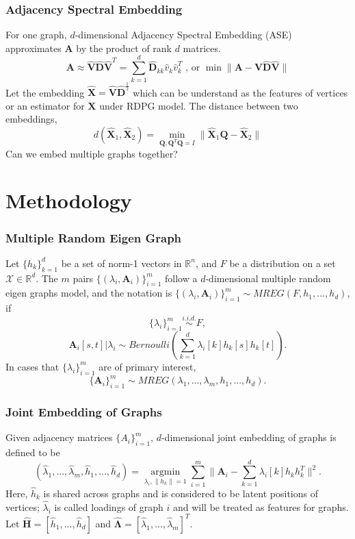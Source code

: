 \documentclass[]{beamer}
\newcommand{\bA}{\mathbf{A}}
\newcommand{\bH}{\mathbf{H}}
\newcommand{\bX}{\mathbf{X}}
\newcommand{\bD}{\mathbf{D}}
\newcommand{\bV}{\mathbf{V}}
\newcommand{\bQ}{\mathbf{Q}}
\newcommand{\bLambda}{\mathbf{\Lambda}}
\begin{document}
\begin{frame}
	\frametitle{Adjacency Spectral Embedding}
For one graph, $d$-dimensional Adjacency Spectral Embedding (ASE) approximates $\bA$ by the product of rank $d$ matrices.
\begin{equation} 
	\bA \approx \hat{\bV} \hat{\bD} \hat{\bV} ^T = \sum_{k=1}^{d} \hat{\bD}_{kk} \hat{v}_k \hat{v}_k^T  \text{ , or } \min \|\bA -\hat{\bV} \hat{\bD} \hat{\bV} \|
\end{equation}
Let the embedding $\hat{\bX}=\hat{\bV} \hat{\bD}^{\frac{1}{2}}$ which can be understand as the features of vertices or an estimator for $\bX$ under RDPG model. The distance between two embeddings,
\[d(\hat{\bX}_1,\hat{\bX}_2)= \underset{\bQ,\bQ^T\bQ=I}{\min} \|\hat{\bX}_1 \bQ- \hat{\bX}_2 \| \]
Can we embed multiple graphs together? 
\end{frame}


\section{Methodology}
\begin{frame}
	\frametitle{Multiple Random Eigen Graph}
Let $\{h_k\}_{k=1}^{d}$ be a set of norm-1 vectors in $\mathbb{R}^{n}$, and  $F$ be a distribution on a set $\mathcal{X} \in \mathbb{R}^d$. The $m$ pairs $\{(\lambda_i, \bA_i)\}_{i=1}^m$ follow a $d$-dimensional multiple random eigen graphs model, and the notation is $\{(\lambda_i,\bA_i)\}_{i=1}^m \sim MREG(F,h_1,...,h_d)$, if 
\[\{\lambda_i\}_{i=1}^m \overset{i.i.d.}{\sim} F, \]
\[ \bA_{i}[s,t]  | \lambda_i \sim Bernoulli( \sum_{k=1}^{d} \lambda_{i}[k] h_{k} [s] h_{k} [t] ). \]
In cases that $\{\lambda_i\}_{i=1}^m$ are of primary interest, 
\[\{\bA_i\}_{i=1}^{m} \sim MREG(\lambda_1,...,\lambda_m,h_1,...,h_d).\] 
\end{frame}



\begin{frame}
	\frametitle{Joint Embedding of Graphs}
Given adjacency matrices $\{A_i\}_{i=1}^m$, $d$-dimensional joint embedding of graphs is defined to be 
\begin{equation}\label{eq:1}
(\hat{\lambda}_1,...,\hat{\lambda}_m,\hat{h}_1,...,\hat{h}_d) = \underset{\lambda_i,\|h_k\|=1}{\operatorname{argmin}} \sum\limits_{i=1}^{m} \| \bA_i- \sum\limits_{k=1}^{d} \lambda_{i}[k] h_k h_k^T \|  ^2.  
\end{equation}
Here, $\hat{h}_k$ is shared across  graphs and is considered to be latent positions of vertices; $\hat{\lambda}_i$ is called loadings of graph $i$ and will be treated as features for graphs. Let $\hat{\bH}=[\hat{h}_1,...,\hat{h}_d]$ and $\hat{\bLambda}=[\hat{\lambda}_1,...,\hat{\lambda}_m]^T$.
\end{frame}
\end{document}
